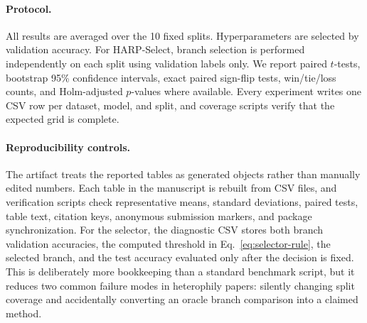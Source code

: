 \documentclass[letterpaper]{article} %
\newcommand{\esep}{HARP-ESep}
\newcommand{\method}{HARP-Select}
\newcommand{\papertablesize}{\footnotesize}
\begin{document}
\paragraph{Protocol.}
All results are averaged over the 10 fixed splits.
Hyperparameters are selected by validation accuracy.
For \method, branch selection is performed independently on each split using validation labels only.
We report paired $t$-tests, bootstrap 95\% confidence intervals, exact paired sign-flip tests, win/tie/loss counts, and Holm-adjusted $p$-values where available.
Every experiment writes one CSV row per dataset, model, and split, and coverage scripts verify that the expected grid is complete.

\paragraph{Reproducibility controls.}
The artifact treats the reported tables as generated objects rather than manually edited numbers.
Each table in the manuscript is rebuilt from CSV files, and verification scripts check representative means, standard deviations, paired tests, table text, citation keys, anonymous submission markers, and package synchronization.
For the selector, the diagnostic CSV stores both branch validation accuracies, the computed threshold in Eq.~\ref{eq:selector-rule}, the selected branch, and the test accuracy evaluated only after the decision is fixed.
This is deliberately more bookkeeping than a standard benchmark script, but it reduces two common failure modes in heterophily papers: silently changing split coverage and accidentally converting an oracle branch comparison into a claimed method.

\begin{table}[t]
\centering
\caption{\method{} summary over fixed splits. HARP-Select chooses \esep{} only when its validation advantage exceeds the frozen $1.96\,\mathrm{SE}$ threshold. Oracle is reported only as diagnostic regret, not as a method.}
\label{tab:harp-select}
\begingroup
\setlength{\tabcolsep}{2.2pt}
\renewcommand{\arraystretch}{1.08}
\papertablesize
{}
\endgroup
\end{table}
\end{document}
